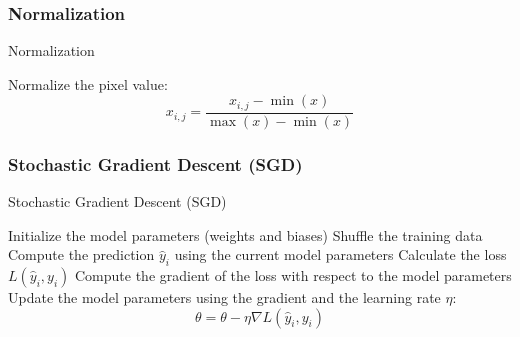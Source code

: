\subsubsection{Normalization}


\begin{algorithm}
    \caption{Normalization}
    \begin{algorithmic}[1]
        \STATE Normalize the pixel value:
        \[
            x_{i,j} = \frac{x_{i,j} - \min(x)}{\max(x) - \min(x)}
        \]
        \ENDFOR
        \ENDFOR
    \end{algorithmic}
\end{algorithm}

\subsubsection{Stochastic Gradient Descent (SGD)}


\begin{algorithm}
    \caption{Stochastic Gradient Descent (SGD)}
    \begin{algorithmic}[1]
        \STATE Initialize the model parameters (weights and biases)
        \STATE Shuffle the training data
        \STATE Compute the prediction \(\hat{y}_i\) using the current model parameters
        \STATE Calculate the loss \(L(\hat{y}_i, y_i)\)
        \STATE Compute the gradient of the loss with respect to the model parameters
        \STATE Update the model parameters using the gradient and the learning rate \(\eta\):
        \[
            \theta = \theta - \eta \nabla L(\hat{y}_i, y_i)
        \]
        \ENDFOR
        \ENDFOR
    \end{algorithmic}
\end{algorithm}

